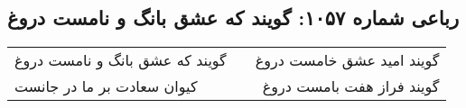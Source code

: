 \begin{center}
\section*{رباعی شماره ۱۰۵۷: گویند که عشق بانگ و نامست دروغ}
\label{sec:1057}
\begin{longtable}{l p{0.5cm} r}
گویند که عشق بانگ و نامست دروغ
&&
گویند امید عشق خامست دروغ
\\
کیوان سعادت بر ما در جانست
&&
گویند فراز هفت بامست دروغ
\\
\end{longtable}
\end{center}
